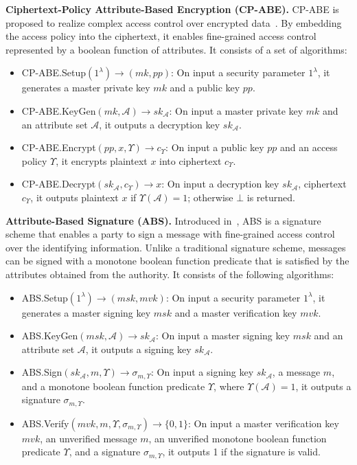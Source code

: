 \textbf{Ciphertext-Policy Attribute-Based Encryption (CP-ABE).}
CP-ABE is proposed to realize complex access control over encrypted data~\cite{10.1109/sp.2007.11}. By embedding the access policy into the ciphertext, it enables fine-grained access control represented by a boolean function of attributes.
It consists of a set of algorithms:
\begin{itemize}
  \item \textsf{CP-ABE.Setup}$(1^\lambda) \to (mk, pp)$:
    On input a security parameter $1^\lambda$, it generates a master private key $mk$ and a public key $pp$.
  \item \textsf{CP-ABE.KeyGen}$(mk, \mathcal{A}) \to {sk}_\mathcal{A}$:
    On input a master private key $mk$ and an attribute set $\mathcal{A}$, it outputs a decryption key ${sk}_\mathcal{A}$.
  \item \textsf{CP-ABE.Encrypt}$(pp, x, \Upsilon) \to c_{\Upsilon}$:
    On input a public key $pp$ and an access policy $\Upsilon$, it encrypts plaintext $x$ into ciphertext $c_\Upsilon$.
  \item \textsf{CP-ABE.Decrypt}$({sk}_\mathcal{A}, c_\Upsilon) \to x$:
    On input a decryption key ${sk}_\mathcal{A}$, ciphertext $c_\Upsilon$, it outputs plaintext $x$ if $\Upsilon(\mathcal{A}) = 1$; otherwise $\bot$ is returned.
\end{itemize}

\textbf{Attribute-Based Signature (ABS).}
Introduced in~\cite{10.1007/978-3-642-19074-2_24}, ABS is a signature scheme that enables a party to sign a message with fine-grained access control over the identifying information. Unlike a traditional signature scheme, messages can be signed with a monotone boolean function predicate that is satisfied by the attributes obtained from the authority. It consists of the following algorithms:
\begin{itemize}
  \item \textsf{ABS.Setup}$(1^\lambda) \to (msk, mvk)$:
    On input a security parameter $1^\lambda$, it generates a master signing key $msk$ and a master verification key $mvk$.
  \item \textsf{ABS.KeyGen}$(msk, \mathcal{A}) \to {sk}_\mathcal{A}$:
    On input a master signing key $msk$ and an attribute set $\mathcal{A}$, it outputs a signing key ${sk}_\mathcal{A}$.
  \item \textsf{ABS.Sign}$({sk}_\mathcal{A}, m, \Upsilon) \to \sigma_{m,\Upsilon}$:
    On input a signing key ${sk}_\mathcal{A}$, a message $m$, and a monotone boolean function predicate $\Upsilon$, where $\Upsilon(\mathcal{A}) = 1$, it outputs a signature $\sigma_{m,\Upsilon}$.
  \item \textsf{ABS.Verify}$(mvk, m, \Upsilon, \sigma_{m,\Upsilon}) \to \{0, 1\}$:
    On input a master verification key $mvk$, an unverified message $m$, an unverified monotone boolean function predicate $\Upsilon$, and a signature $\sigma_{m,\Upsilon}$, it outputs 1 if the signature is valid.
\end{itemize}

